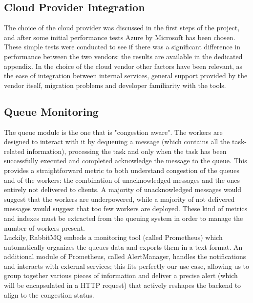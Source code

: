 \subsection{Cloud Provider Integration}
  The choice of the cloud provider was discussed in the first steps of the project, and after some initial performance tests Azure by Microsoft has been chosen. These simple tests were conducted to see if there was a significant difference in performance between the two vendors: the results are available in the dedicated appendix. In the choice of the cloud vendor other factors have been relevant, as the ease of integration between internal services, general support provided by the vendor itself, migration problems and developer familiarity with the tools.

\subsection{Queue Monitoring}
  The queue module is the one that is "congestion aware". The workers are designed to interact with it by dequeuing a message (which contains all the task-related information), processing the task and only when the task has been successfully executed and completed acknowledge the message to the queue. This provides a straightforward metric to both understand congestion of the queues and of the workers: the combination of unacknowledged messages and the ones entirely not delivered to clients. A majority of unacknowledged messages would suggest that the workers are underpowered, while a majority of not delivered messages would suggest that too few workers are deployed. These kind of metrics and indexes must be extracted from the queuing system in order to manage the number of workers present.\\
  Luckily, RabbitMQ embeds a monitoring tool (called Prometheus) which automatically organizes the queues data and exports them in a text format. An additional module of Prometheus, called AlertManager, handles the notifications and interacts with external services; this fits perfectly our use case, allowing us to group together various pieces of information and deliver a precise alert (which will be encapsulated in a HTTP request) that actively reshapes the backend to align to the congestion status.
